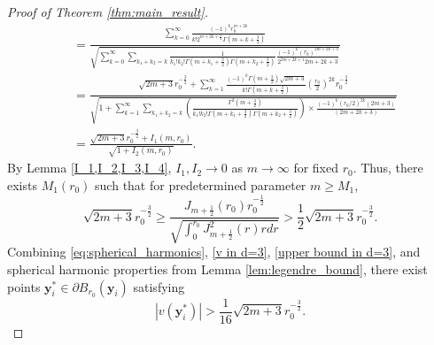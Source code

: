 \documentclass[11pt,reqno,oneside]{amsart}
\numberwithin{equation}{section}
\theoremstyle{definition}
\theoremstyle{remark}
\numberwithin{equation}{section}
\begin{document}
\begin{proof}[Proof of Theorem \ref{thm:main_result}]
\begin{equation}
\begin{aligned}
				&=\frac{\sum_{k=0}^{\infty}\frac{(-1)^{k}r_{0}^{m+2k}}{k!2^{m+2k+\frac{1}{2}}\Gamma(m+k+\frac{3}{2})}}{\sqrt{\sum_{k=0}^{\infty}\sum_{k_1+k_2=k}\frac{1}{k_1{!}k_2{!}\Gamma(m+k_1+\frac{3}{2})\Gamma(m+k_2+\frac{3}{2})}\frac{(-1)^k(r_0)^{2m+2k+3}}{2^{2m+2k+1}2m+2k+3}}}\\
				&=\frac{\sqrt{2m+3}r_0^{-\frac{3}{2}}+\sum_{k=1}^{\infty}\frac{(-1)^k\Gamma(m+\frac{3}{2})\sqrt{2m+3} }{k!\Gamma(m+k+\frac{3}{2})}\left(\frac{r_0}{2}\right)^{2k}r_0^{-\frac{3}{2}}}{\sqrt{1+\sum_{k=1}^{\infty}\sum_{k_1+k_2=k}\left(\frac{\Gamma^2(m+\frac{3}{2})}{k_1!k_2!\Gamma(m+k_1+\frac{3}{2})\Gamma(m+k_2+\frac{3}{2})}\right)\times\frac{(-1)^k( r_0/2)^{2k}(2m+3)}{(2m+2k+3)}}}\\
				&=\frac{\sqrt{2m+3}r_0^{-\frac{3}{2}}+I_1(m,r_0)}{\sqrt{1+I_2(m, r_0)}}.
			\end{aligned}
		\end{equation}
		By Lemma \ref{I_1,I_2,I_3,I_4}, $I_1, I_2 \to 0$ as $m \to \infty$ for fixed $r_0$. Thus, there exists $M_1(r_0)$ such that for predetermined parameter $m \geqslant M_1$,
		\begin{equation}\label{upper bound in d=3}
	 \sqrt{2m+3}  r_0^{-\frac{3}{2}}	\geq	\frac{J_{m+\frac{1}{2}}( r_0)  r_0^{-\frac{1}{2}}}{\sqrt{\int_0^{ r_0} J_{m+\frac{1}{2}}^2(r) r  dr}} > \frac{1}{2} \sqrt{2m+3}  r_0^{-\frac{3}{2}}.
		\end{equation}
		Combining \eqref{eq:spherical_harmonics}, \eqref{v in d=3}, \eqref{upper bound in d=3}, and spherical harmonic properties from Lemma \ref{lem:legendre_bound}, there exist points $\mathbf{y}^*_i \in \partial B_{r_0}(\mathbf{y}_i)$ satisfying
		\begin{equation}\label{3.12}
			|v(\mathbf{y}^*_i)| > \frac{1}{16} \sqrt{2m+3}  r_0^{-\frac{3}{2}}.
		\end{equation}
		

\end{proof}
\end{document}

